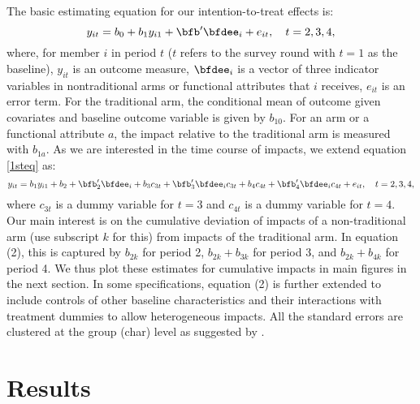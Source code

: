 	The basic estimating equation for our intention-to-treat effects is:
	\begin{equation}
	y_{it}=b_{0}+b_{1}y_{i1}+\bfb'\bfdee_{i}+e_{it}, \quad t=2, 3, 4,
	\label{1steq}
	\end{equation}
	where, for member $i$ in period $t$ ($t$ refers to the survey round with $t=1$ as the baseline), $y_{it}$ is an outcome measure, $\bfdee_{i}$ is a vector of three indicator variables in nontraditional arms or functional attributes that $i$ receives, $e_{it}$ is an error term. For the \textsf{traditional} arm, the conditional mean of outcome given covariates and baseline outcome variable is given by $b_{10}$. For an arm or a functional attribute $a$, the impact relative to the traditional arm is measured with $b_{1a}$. As we are interested in the time course of impacts, we extend equation \eqref{1steq} as:
	\begin{equation}
	y_{it}=b_{1}y_{i1}+b_{2}+\bfb'_{2}\bfdee_{i}+b_{3}c_{3t}+\bfb'_{3}\bfdee_{i}c_{3t}+b_{4}c_{4t}+\bfb'_{4}\bfdee_{i}c_{4t}+e_{it}, \quad t=2, 3, 4,
	\label{EstimatingEqTimeVarying}
	\end{equation}
	where $c_{3t}$ is a dummy variable for $t=3$ and $c_{4t}$ is a dummy variable for $t=4$. Our main interest is on the cumulative deviation of impacts of a non-traditional arm (use subscript $k$ for this) from impacts of the traditional arm. In equation (2), this is captured by $b_{2k}$ for period 2, $b_{2k} + b_{3k}$ for period 3, and $b_{2k} + b_{4k}$ for period 4. We thus plot these estimates for cumulative impacts in main figures in the next section. In some specifications, equation (2) is further extended to include controls of other baseline characteristics and their interactions with treatment dummies to allow heterogeneous impacts. All the standard errors are clustered at the group (char) level as suggested by \citet{AbadieAtheyImbensWooldridge2017}.%


\section{Results}
\label{SecResults}







